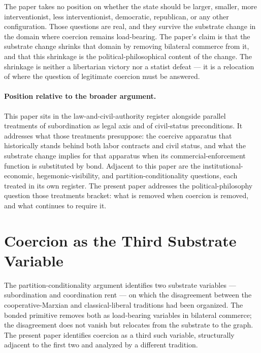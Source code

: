 \documentclass[11pt,a4paper]{article}
\theoremstyle{remark}
\begin{document}
The paper takes no position on whether the state should be
larger, smaller, more interventionist, less interventionist,
democratic, republican, or any other configuration. Those
questions are real, and they survive the substrate change in the
domain where coercion remains load-bearing. The paper's claim is
that the substrate change shrinks that domain by removing
bilateral commerce from it, and that this shrinkage is the
political-philosophical content of the change. The shrinkage is
neither a libertarian victory nor a statist defeat --- it is a
relocation of where the question of legitimate coercion must be
answered.

\paragraph{Position relative to the broader argument.}
This paper sits in the law-and-civil-authority register
alongside parallel treatments of subordination as legal axis and
of civil-status preconditions. It addresses what those
treatments presuppose: the coercive apparatus that historically
stands behind both labor contracts and civil status, and what
the substrate change implies for that apparatus when its
commercial-enforcement function is substituted by bond. Adjacent
to this paper are the institutional-economic, hegemonic-visibility,
and partition-conditionality questions, each treated in its own
register. The present paper addresses the political-philosophy
question those treatments bracket: what is removed when coercion
is removed, and what continues to require it.

\section{Coercion as the Third Substrate Variable}
\label{sec:third-variable}

The partition-conditionality argument identifies two substrate
variables --- subordination and coordination rent --- on which
the disagreement between the cooperative-Marxian and
classical-liberal traditions had been organized. The bonded
primitive removes both as load-bearing variables in bilateral
commerce; the disagreement does not vanish but relocates from the
substrate to the graph. The present paper identifies coercion as
a third such variable, structurally adjacent to the first two and
analyzed by a different tradition.
\end{document}
